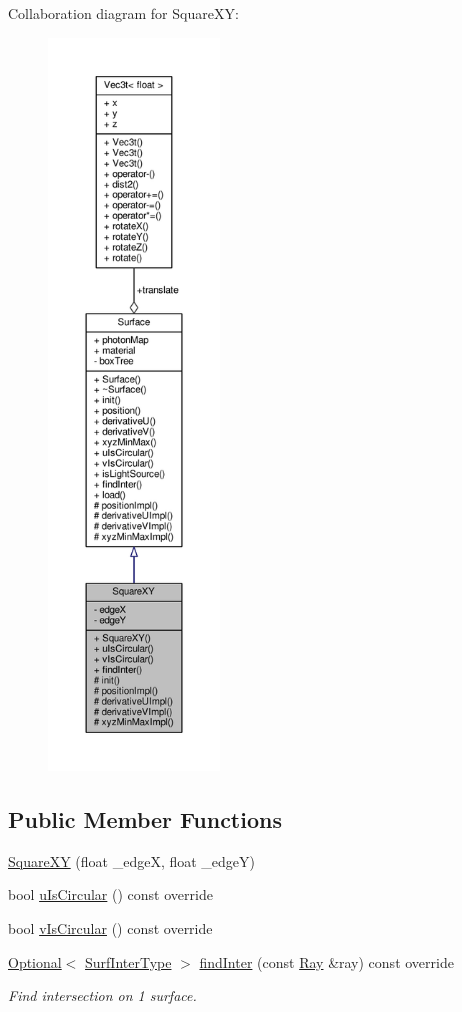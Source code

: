 Collaboration diagram for Square\+XY\+:\nopagebreak
\begin{figure}[H]
\begin{center}
\leavevmode
\includegraphics[height=550pt]{classSquareXY__coll__graph}
\end{center}
\end{figure}
\subsection*{Public Member Functions}
\begin{DoxyCompactItemize}
\item 
\hyperlink{classSquareXY_abeafd51f0c01d2c479f0d87ccb66567e}{Square\+XY} (float \+\_\+edgeX, float \+\_\+edgeY)
\item 
bool \hyperlink{classSquareXY_a060cba6cee229bbe185bd59fbc49c461}{u\+Is\+Circular} () const override
\item 
bool \hyperlink{classSquareXY_aeebe33da47d345225afba03b8aa110dc}{v\+Is\+Circular} () const override
\item 
\hyperlink{classOptional}{Optional}$<$ \hyperlink{structSurfInterType}{Surf\+Inter\+Type} $>$ \hyperlink{classSquareXY_a33545d952933da0107ca9d9a6c8301ff}{find\+Inter} (const \hyperlink{structRay}{Ray} \&ray) const override
\begin{DoxyCompactList}\small\item\em Find intersection on 1 surface. \end{DoxyCompactList}\end{DoxyCompactItemize}
